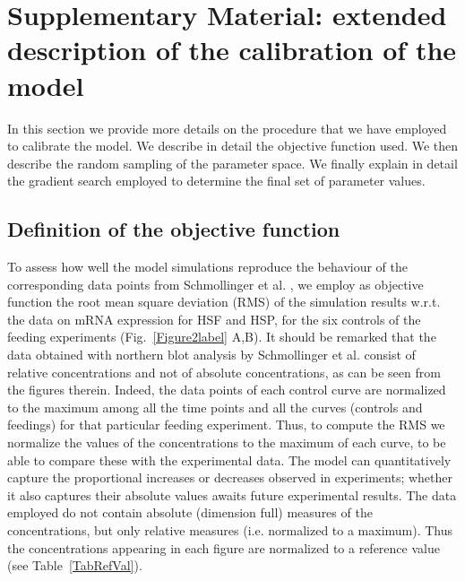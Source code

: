 \documentclass[oneside, 10pt, a4paper, twocolumn]{article}
\begin{document}
\clearpage


\section{Supplementary Material: extended description of the calibration of the model}
\label{SecCalibrationExtended}

In this section we provide more details on the procedure that we have employed to calibrate the model. We describe in detail the objective function used. We then describe the random sampling of the parameter space. We finally explain in detail the gradient search employed to determine the final set of parameter values.

\subsection{Definition of the objective function}

To assess how well the model simulations reproduce the behaviour of the corresponding data points from Schmollinger et al. \cite{Schmollinger2013}, we employ as objective function the root mean square deviation (RMS) of the simulation results w.r.t. the data on mRNA expression for HSF and HSP, for the six controls of the feeding experiments (Fig.~\ref{Figure2label} A,B). 
{It should be remarked that the data obtained with
  northern blot analysis by Schmollinger et
  al. \cite{Schmollinger2013} consist of relative concentrations and
  not of absolute concentrations, as can be seen from the figures
  therein. Indeed, the data points of each control curve are
  normalized to the maximum among all the time points and all the
  curves (controls and feedings) for that particular feeding
  experiment.} Thus, to compute the RMS we normalize the values of the
concentrations to the maximum of each curve, to be able to compare
these with the experimental data. The model can quantitatively capture the proportional increases or decreases observed in experiments; whether it also captures their absolute values awaits future experimental results.
The data employed do not contain absolute
(dimension full) measures of the concentrations, but only relative
measures (i.e. normalized to a maximum). Thus the concentrations
appearing in each figure are normalized to a reference value (see
Table~\ref{TabRefVal}).
\end{document}
